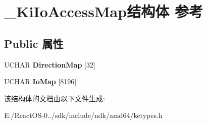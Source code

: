 \hypertarget{struct___ki_io_access_map}{}\section{\+\_\+\+Ki\+Io\+Access\+Map结构体 参考}
\label{struct___ki_io_access_map}
\subsection*{Public 属性}
\begin{DoxyCompactItemize}
\item 
\mbox{\label{struct___ki_io_access_map_a1fe65d6c2d39bbb87e4ed9fa83b62ec2}} 
U\+C\+H\+AR {\bfseries Direction\+Map} \mbox{[}32\mbox{]}
\item 
\mbox{\label{struct___ki_io_access_map_a8d8869087dbe5683890a0021a7d41638}} 
U\+C\+H\+AR {\bfseries Io\+Map} \mbox{[}8196\mbox{]}
\end{DoxyCompactItemize}


该结构体的文档由以下文件生成\+:\begin{DoxyCompactItemize}
\item 
E\+:/\+React\+O\+S-\/0../sdk/include/ndk/amd64/ketypes.\+h\end{DoxyCompactItemize}
